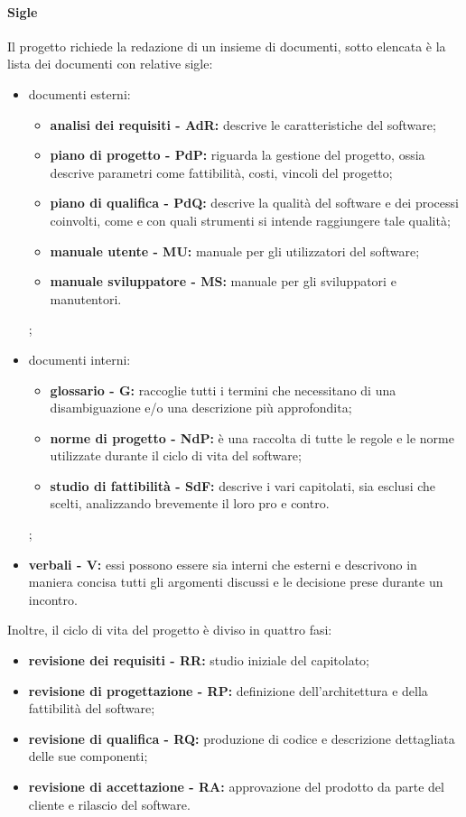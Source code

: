 			\paragraph{Sigle}
				Il progetto richiede la redazione di un insieme di documenti, sotto elencata è la lista dei documenti con relative sigle:
				\begin{itemize}
					\item documenti esterni:
						\begin{itemize}
							\item \textbf{analisi dei requisiti - AdR:} descrive le caratteristiche del software;
							\item \textbf{piano di progetto - PdP:} riguarda la gestione del progetto, ossia descrive parametri come fattibilità, costi, vincoli del progetto;
							\item \textbf{piano di qualifica - PdQ:} descrive la qualità del software e dei processi coinvolti, come e con quali strumenti si intende raggiungere tale qualità;
							\item \textbf{manuale utente - MU:} manuale per gli utilizzatori del software;
							\item \textbf{manuale sviluppatore - MS:} manuale per gli sviluppatori e manutentori.
						\end{itemize};
					\item documenti interni:
						\begin{itemize}
							\item \textbf{glossario - G:} raccoglie tutti i termini che necessitano di una disambiguazione e/o una descrizione più approfondita;
							\item \textbf{norme di progetto - NdP:} è una raccolta di tutte le regole e le norme utilizzate durante il ciclo di vita del software;
							\item \textbf{studio di fattibilità - SdF:} descrive i vari capitolati, sia esclusi che scelti, analizzando brevemente il loro pro e contro.
						\end{itemize};
					\item \textbf{verbali - V:} essi possono essere sia interni che esterni e descrivono in maniera concisa tutti gli argomenti discussi e le decisione prese durante un incontro.
				\end{itemize}
				Inoltre, il ciclo di vita del progetto è diviso in quattro fasi:
				\begin{itemize}
					\item \textbf{revisione dei requisiti - RR:} studio iniziale del capitolato;
					\item \textbf{revisione di progettazione - RP:} definizione dell'architettura e della fattibilità del software;
					\item \textbf{revisione di qualifica - RQ:} produzione di codice e descrizione dettagliata delle sue componenti;
					\item \textbf{revisione di accettazione - RA:} approvazione del prodotto da parte del cliente e rilascio del software.
				\end{itemize}
